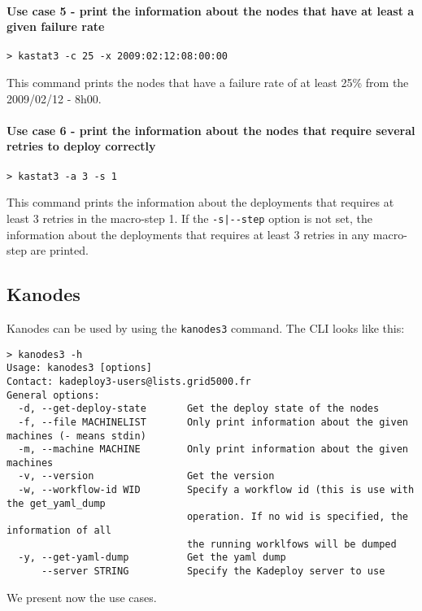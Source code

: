 \documentclass[a4wide,10pt,oneside]{book}
\begin{document}
\paragraph{Use case 5 - print the information about the nodes that have at least a given failure rate}
\begin{verbatim}
> kastat3 -c 25 -x 2009:02:12:08:00:00
\end{verbatim}
This command prints the nodes that have a failure rate of at least 25\% from the 2009/02/12 - 8h00.

\paragraph{Use case 6 - print the information about the nodes that require several retries to deploy correctly}
\begin{verbatim}
> kastat3 -a 3 -s 1
\end{verbatim}
This command prints the information about the deployments that requires at least 3 retries in the macro-step 1. If the \texttt{-s|-{}-step} option is not set, the information about the deployments that requires at least 3 retries in any macro-step are printed.


\subsection{Kanodes}\label{sec:kanodes}
Kanodes can be used by using the \texttt{kanodes3} command. The CLI looks like this:
\begin{small}
\begin{verbatim}
> kanodes3 -h
Usage: kanodes3 [options]
Contact: kadeploy3-users@lists.grid5000.fr
General options:
  -d, --get-deploy-state       Get the deploy state of the nodes
  -f, --file MACHINELIST       Only print information about the given machines (- means stdin)
  -m, --machine MACHINE        Only print information about the given machines
  -v, --version                Get the version
  -w, --workflow-id WID        Specify a workflow id (this is use with the get_yaml_dump
                               operation. If no wid is specified, the information of all
                               the running worklfows will be dumped
  -y, --get-yaml-dump          Get the yaml dump
      --server STRING          Specify the Kadeploy server to use
\end{verbatim}
\end{small}

We present now the use cases.
\end{document}
